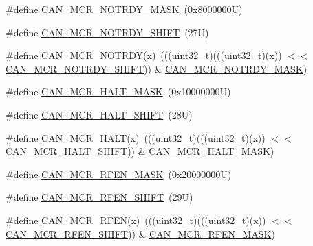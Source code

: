 \begin{DoxyCompactItemize}
\item 
\#define \mbox{\hyperlink{group___c_a_n___register___masks_ga013a34c0c5b808052d13ed4b9db2af75}{C\+A\+N\+\_\+\+M\+C\+R\+\_\+\+N\+O\+T\+R\+D\+Y\+\_\+\+M\+A\+SK}}~(0x8000000\+U)
\item 
\#define \mbox{\hyperlink{group___c_a_n___register___masks_ga90886e532a436fbd5b6e94e723acd148}{C\+A\+N\+\_\+\+M\+C\+R\+\_\+\+N\+O\+T\+R\+D\+Y\+\_\+\+S\+H\+I\+FT}}~(27\+U)
\item 
\#define \mbox{\hyperlink{group___c_a_n___register___masks_ga5d01fd09c4ed47ee3d81e41e001f2b09}{C\+A\+N\+\_\+\+M\+C\+R\+\_\+\+N\+O\+T\+R\+DY}}(x)~(((uint32\+\_\+t)(((uint32\+\_\+t)(x)) $<$$<$ \mbox{\hyperlink{group___c_a_n___register___masks_ga90886e532a436fbd5b6e94e723acd148}{C\+A\+N\+\_\+\+M\+C\+R\+\_\+\+N\+O\+T\+R\+D\+Y\+\_\+\+S\+H\+I\+FT}})) \& \mbox{\hyperlink{group___c_a_n___register___masks_ga013a34c0c5b808052d13ed4b9db2af75}{C\+A\+N\+\_\+\+M\+C\+R\+\_\+\+N\+O\+T\+R\+D\+Y\+\_\+\+M\+A\+SK}})
\item 
\#define \mbox{\hyperlink{group___c_a_n___register___masks_gad5282ba01498ad05fa9ce4387050f1df}{C\+A\+N\+\_\+\+M\+C\+R\+\_\+\+H\+A\+L\+T\+\_\+\+M\+A\+SK}}~(0x10000000\+U)
\item 
\#define \mbox{\hyperlink{group___c_a_n___register___masks_gab976a082962ddeb0a7738bc5385b35da}{C\+A\+N\+\_\+\+M\+C\+R\+\_\+\+H\+A\+L\+T\+\_\+\+S\+H\+I\+FT}}~(28\+U)
\item 
\#define \mbox{\hyperlink{group___c_a_n___register___masks_ga8bb51d38c56b2536b21a45f2ae4077c7}{C\+A\+N\+\_\+\+M\+C\+R\+\_\+\+H\+A\+LT}}(x)~(((uint32\+\_\+t)(((uint32\+\_\+t)(x)) $<$$<$ \mbox{\hyperlink{group___c_a_n___register___masks_gab976a082962ddeb0a7738bc5385b35da}{C\+A\+N\+\_\+\+M\+C\+R\+\_\+\+H\+A\+L\+T\+\_\+\+S\+H\+I\+FT}})) \& \mbox{\hyperlink{group___c_a_n___register___masks_gad5282ba01498ad05fa9ce4387050f1df}{C\+A\+N\+\_\+\+M\+C\+R\+\_\+\+H\+A\+L\+T\+\_\+\+M\+A\+SK}})
\item 
\#define \mbox{\hyperlink{group___c_a_n___register___masks_ga55cd060ac6cdad670aeb97522a118930}{C\+A\+N\+\_\+\+M\+C\+R\+\_\+\+R\+F\+E\+N\+\_\+\+M\+A\+SK}}~(0x20000000\+U)
\item 
\#define \mbox{\hyperlink{group___c_a_n___register___masks_gaffab6b0e09ace8e09cb1487dd6639955}{C\+A\+N\+\_\+\+M\+C\+R\+\_\+\+R\+F\+E\+N\+\_\+\+S\+H\+I\+FT}}~(29\+U)
\item 
\#define \mbox{\hyperlink{group___c_a_n___register___masks_ga9e90761fd2e6a7ce0ff5a2ad70493bbd}{C\+A\+N\+\_\+\+M\+C\+R\+\_\+\+R\+F\+EN}}(x)~(((uint32\+\_\+t)(((uint32\+\_\+t)(x)) $<$$<$ \mbox{\hyperlink{group___c_a_n___register___masks_gaffab6b0e09ace8e09cb1487dd6639955}{C\+A\+N\+\_\+\+M\+C\+R\+\_\+\+R\+F\+E\+N\+\_\+\+S\+H\+I\+FT}})) \& \mbox{\hyperlink{group___c_a_n___register___masks_ga55cd060ac6cdad670aeb97522a118930}{C\+A\+N\+\_\+\+M\+C\+R\+\_\+\+R\+F\+E\+N\+\_\+\+M\+A\+SK}})
$$
\end{DoxyCompactItemize}
